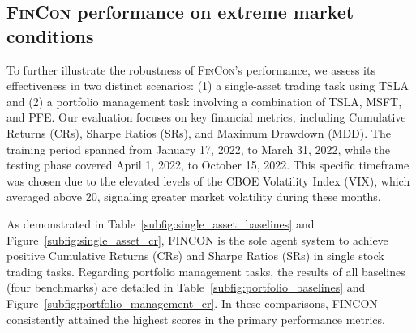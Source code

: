 \subsection{\textsc{FinCon} performance on extreme market conditions}
\label{app:extreme_market}
To further illustrate the robustness of \textsc{FinCon}'s performance, we assess its effectiveness in two distinct scenarios: (1) a single-asset trading task using TSLA and (2) a portfolio management task involving a combination of TSLA, MSFT, and PFE. Our evaluation focuses on key financial metrics, including Cumulative Returns (CRs), Sharpe Ratios (SRs), and Maximum Drawdown (MDD). The training period spanned from January 17, 2022, to March 31, 2022, while the testing phase covered April 1, 2022, to October 15, 2022. This specific timeframe was chosen due to the elevated levels of the CBOE Volatility Index (VIX), which averaged above 20, signaling greater market volatility during these months.

As demonstrated in Table~\ref{subfig:single_asset_baselines} and Figure~\ref{subfig:single_asset_cr}, \textsc{FINCON} is the sole agent system to achieve positive Cumulative Returns (CRs) and Sharpe Ratios (SRs) in single stock trading tasks. Regarding portfolio management tasks, the results of all baselines (four benchmarks) are detailed in Table~\ref{subfig:portfolio_baselines} and Figure~\ref{subfig:portfolio_management_cr}. In these comparisons, \textsc{FINCON} consistently attained the highest scores in the primary performance metrics.

